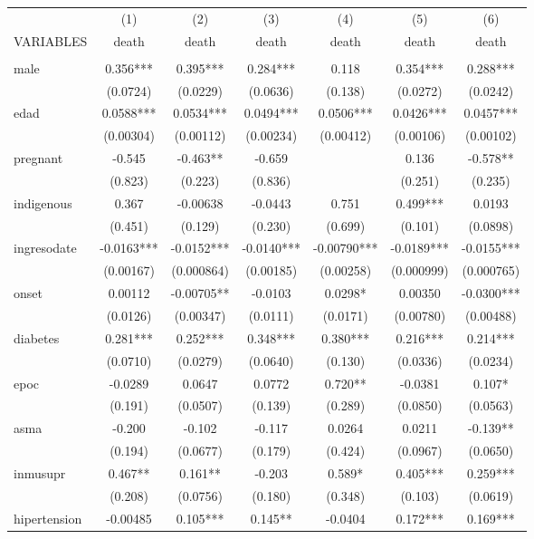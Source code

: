 \documentclass[]{article}
\begin{document}
\begin{tabular}{lcccccc} \hline
 & (1) & (2) & (3) & (4) & (5) & (6) \\
VARIABLES & death & death & death & death & death & death \\ \hline
 &  &  &  &  &  &  \\
male & 0.356*** & 0.395*** & 0.284*** & 0.118 & 0.354*** & 0.288*** \\
 & (0.0724) & (0.0229) & (0.0636) & (0.138) & (0.0272) & (0.0242) \\
edad & 0.0588*** & 0.0534*** & 0.0494*** & 0.0506*** & 0.0426*** & 0.0457*** \\
 & (0.00304) & (0.00112) & (0.00234) & (0.00412) & (0.00106) & (0.00102) \\
pregnant & -0.545 & -0.463** & -0.659 &  & 0.136 & -0.578** \\
 & (0.823) & (0.223) & (0.836) &  & (0.251) & (0.235) \\
indigenous & 0.367 & -0.00638 & -0.0443 & 0.751 & 0.499*** & 0.0193 \\
 & (0.451) & (0.129) & (0.230) & (0.699) & (0.101) & (0.0898) \\
ingresodate & -0.0163*** & -0.0152*** & -0.0140*** & -0.00790*** & -0.0189*** & -0.0155*** \\
 & (0.00167) & (0.000864) & (0.00185) & (0.00258) & (0.000999) & (0.000765) \\
onset & 0.00112 & -0.00705** & -0.0103 & 0.0298* & 0.00350 & -0.0300*** \\
 & (0.0126) & (0.00347) & (0.0111) & (0.0171) & (0.00780) & (0.00488) \\
diabetes & 0.281*** & 0.252*** & 0.348*** & 0.380*** & 0.216*** & 0.214*** \\
 & (0.0710) & (0.0279) & (0.0640) & (0.130) & (0.0336) & (0.0234) \\
epoc & -0.0289 & 0.0647 & 0.0772 & 0.720** & -0.0381 & 0.107* \\
 & (0.191) & (0.0507) & (0.139) & (0.289) & (0.0850) & (0.0563) \\
asma & -0.200 & -0.102 & -0.117 & 0.0264 & 0.0211 & -0.139** \\
 & (0.194) & (0.0677) & (0.179) & (0.424) & (0.0967) & (0.0650) \\
inmusupr & 0.467** & 0.161** & -0.203 & 0.589* & 0.405*** & 0.259*** \\
 & (0.208) & (0.0756) & (0.180) & (0.348) & (0.103) & (0.0619) \\
hipertension & -0.00485 & 0.105*** & 0.145** & -0.0404 & 0.172*** & 0.169*** \\

\end{tabular}
\end{document}
